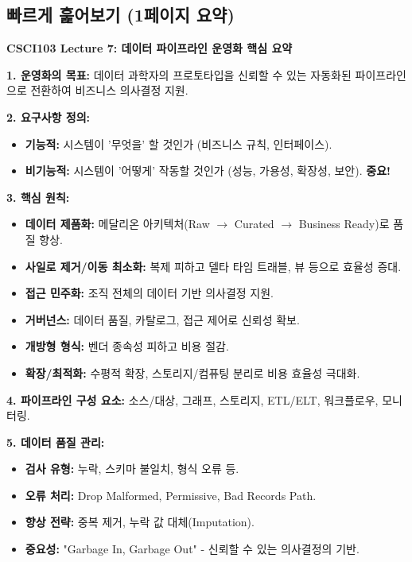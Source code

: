 \documentclass[11pt,a4paper]{article}
\begin{document}
\begin{enumerate}
\newpage
\section*{\centering 빠르게 훑어보기 (1페이지 요약)}

\begin{tcolorbox}[summarybox]
\textbf{CSCI103 Lecture 7: 데이터 파이프라인 운영화 핵심 요약}

\textbf{1. 운영화의 목표:} 데이터 과학자의 프로토타입을 신뢰할 수 있는 자동화된 파이프라인으로 전환하여 비즈니스 의사결정 지원.

\textbf{2. 요구사항 정의:}
\begin{itemize}
    \item \textbf{기능적:} 시스템이 '무엇을' 할 것인가 (비즈니스 규칙, 인터페이스).
    \item \textbf{비기능적:} 시스템이 '어떻게' 작동할 것인가 (성능, 가용성, 확장성, 보안). \textbf{중요!}
\end{itemize}

\textbf{3. 핵심 원칙:}
\begin{itemize}
    \item \textbf{데이터 제품화:} 메달리온 아키텍처(Raw $\rightarrow$ Curated $\rightarrow$ Business Ready)로 품질 향상.
    \item \textbf{사일로 제거/이동 최소화:} 복제 피하고 델타 타임 트래블, 뷰 등으로 효율성 증대.
    \item \textbf{접근 민주화:} 조직 전체의 데이터 기반 의사결정 지원.
    \item \textbf{거버넌스:} 데이터 품질, 카탈로그, 접근 제어로 신뢰성 확보.
    \item \textbf{개방형 형식:} 벤더 종속성 피하고 비용 절감.
    \item \textbf{확장/최적화:} 수평적 확장, 스토리지/컴퓨팅 분리로 비용 효율성 극대화.
\end{itemize}

\textbf{4. 파이프라인 구성 요소:} 소스/대상, 그래프, 스토리지, ETL/ELT, 워크플로우, 모니터링.

\textbf{5. 데이터 품질 관리:}
\begin{itemize}
    \item \textbf{검사 유형:} 누락, 스키마 불일치, 형식 오류 등.
    \item \textbf{오류 처리:} Drop Malformed, Permissive, Bad Records Path.
    \item \textbf{향상 전략:} 중복 제거, 누락 값 대체(Imputation).
    \item \textbf{중요성:} "Garbage In, Garbage Out" - 신뢰할 수 있는 의사결정의 기반.
\end{itemize}


\end{tcolorbox}
\end{enumerate}
\end{document}
